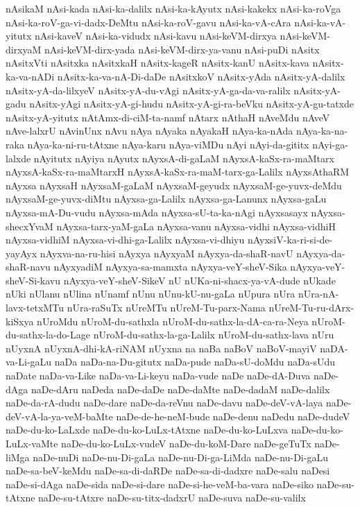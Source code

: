 {nAsikaM
nAsi-kada
nAsi-ka-dalilx
nAsi-ka-kAyutx
nAsi-kakekx
nAsi-ka-roVga
nAsi-ka-roV-ga-vi-dadx-DeMtu
nAsi-ka-roV-gavu
nAsi-ka-vA-cAra
nAsi-ka-vA-yitutx
nAsi-kaveV
nAsi-ka-vidudx
nAsi-kavu
nAsi-keVM-dirxya
nAsi-keVM-dirxyaM
nAsi-keVM-dirx-yada
nAsi-keVM-dirx-ya-vanu
nAsi-puDi
nAsitx
nAsitxVti
nAsitxka
nAsitxkaH
nAsitx-kageR
nAsitx-kanU
nAsitx-kava
nAsitx-ka-va-nADi
nAsitx-ka-va-nA-Di-daDe
nAsitxkoV
nAsitx-yAda
nAsitx-yA-dalilx
nAsitx-yA-da-lilxyeV
nAsitx-yA-du-vAgi
nAsitx-yA-ga-da-va-ralilx
nAsitx-yA-gadu
nAsitx-yAgi
nAsitx-yA-gi-hudu
nAsitx-yA-gi-ra-beVku
nAsitx-yA-gu-tatxde
nAsitx-yA-yitutx
nAtAmx-di-ciM-ta-namf
nAtarx
nAthaH
nAveMdu
nAveV
nAve-lalxrU
nAvinUnx
nAvu
nAya
nAyaka
nAyakaH
nAya-ka-nAda
nAya-ka-na-raka
nAya-ka-ni-ru-tAtxne
nAya-karu
nAya-viMDu
nAyi
nAyi-da-gititx
nAyi-ga-lalxde
nAyitutx
nAyiya
nAyutx
nAyxsA-di-gaLaM
nAyxsA-kaSx-ra-maMtarx
nAyxsA-kaSx-ra-maMtarxH
nAyxsA-kaSx-ra-maM-tarx-ga-Lalilx
nAyxsAthaRM
nAyxsa
nAyxsaH
nAyxsaM-gaLaM
nAyxsaM-geyudx
nAyxsaM-ge-yuvx-deMdu
nAyxsaM-ge-yuvx-diMtu
nAyxsa-ga-Lalilx
nAyxsa-ga-Lanunx
nAyxsa-gaLu
nAyxsa-mA-Du-vudu
nAyxsa-mAda
nAyxsa-sU-ta-ka-nAgi
nAyxsasayx
nAyxsa-shecxYvaM
nAyxsa-tarx-yaM-gaLa
nAyxsa-vanu
nAyxsa-vidhi
nAyxsa-vidhiH
nAyxsa-vidhiM
nAyxsa-vi-dhi-ga-Lalilx
nAyxsa-vi-dhiyu
nAyxsiV-ka-ri-si-de-yayAyx
nAyxva-na-ru-hisi
nAyxya
nAyxyaM
nAyxya-da-shaR-navU
nAyxya-da-shaR-navu
nAyxyadiM
nAyxya-sa-mamxta
nAyxya-veY-sheV-Sika
nAyxya-veY-sheV-Si-kavu
nAyxya-veY-sheV-SikeV
nU
nUKa-ni-shacx-ya-vA-dude
nUkade
nUki
nUlanu
nUlina
nUnamf
nUnu
nUnu-kU-nu-gaLa
nUpura
nUra
nUra-nA-lavx-tetxMTu
nUra-raSuTx
nUreMTu
nUreM-Tu-parx-Nama
nUreM-Tu-ru-dArx-kiSxya
nUroMdu
nUroM-du-sathxla
nUroM-du-sathx-la-dA-ca-ra-Neya
nUroM-du-sathx-la-do-Lage
nUroM-du-sathx-la-ga-Lalilx
nUroM-du-sathx-lava
nUru
nUyxnA
nUyxnA-dhi-kA-riNAM
nUyxna
na
naBa
naBoV
naBoV-mayiV
naDA-va-Li-gaLu
naDa
naDa-na-Du-gitutx
naDa-pude
naDa-sU-doMdu
naDa-sUdu
naDate
naDa-va-Like
naDa-va-Li-keyu
naDa-vude
naDe
naDe-dA-Duva
naDe-dAga
naDe-dAru
naDeda
naDe-daDe
naDe-daMte
naDe-dadaM
naDe-dalilx
naDe-da-rA-dudu
naDe-dare
naDe-da-reVnu
naDe-davu
naDe-deV-vA-laya
naDe-deV-vA-la-ya-veM-baMte
naDe-de-he-neM-bude
naDe-denu
naDedu
naDe-dudeV
naDe-du-ko-LaLxde
naDe-du-ko-LuLx-tAtxne
naDe-du-ko-LuLxva
naDe-du-ko-LuLx-vaMte
naDe-du-ko-LuLx-vudeV
naDe-du-koM-Dare
naDe-geTuTx
naDe-liMga
naDe-nuDi
naDe-nu-Di-gaLa
naDe-nu-Di-ga-LiMda
naDe-nu-Di-gaLu
naDe-sa-beV-keMdu
naDe-sa-di-daRDe
naDe-sa-di-dadxre
naDe-salu
naDesi
naDe-si-dAga
naDe-sida
naDe-si-dare
naDe-si-he-veM-ba-vara
naDe-siko
naDe-su-tAtxne
naDe-su-tAtxre
naDe-su-titx-dadxrU
naDe-suva
naDe-su-valilx
}
